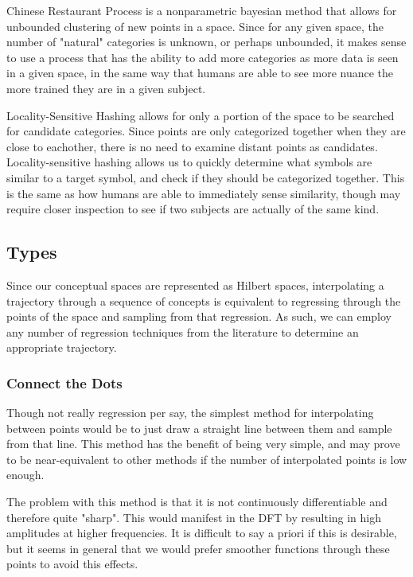 
Chinese Restaurant Process is a nonparametric bayesian method that allows for unbounded clustering of new points in a space. Since for any given space, the number of "natural" categories is unknown, or perhaps unbounded, it makes sense to use a process that has the ability to add more categories as more data is seen in a given space, in the same way that humans are able to see more nuance the more trained they are in a given subject.

Locality-Sensitive Hashing allows for only a portion of the space to be searched for candidate categories.  Since points are only categorized together when they are close to eachother, there is no need to examine distant points as candidates.  Locality-sensitive hashing allows us to quickly determine what symbols are similar to a target symbol, and check if they should be categorized together.  This is the same as how humans are able to immediately sense similarity, though may require closer inspection to see if two subjects are actually of the same kind.


\subsection{Types}
Since our conceptual spaces are represented as Hilbert spaces, interpolating a trajectory through a sequence of concepts is equivalent to regressing through the points of the space and sampling from that regression.  As such, we can employ any number of regression techniques from the literature to determine an appropriate trajectory.

\subsubsection{Connect the Dots}
Though not really regression per say, the simplest method for interpolating between points would be to just draw a straight line between them and sample from that line.  This method has the benefit of being very simple, and may prove to be near-equivalent to other methods if the number of interpolated points is low enough.

The problem with this method is that it is not continuously differentiable and therefore quite "sharp".  This would manifest in the DFT by resulting in high amplitudes at higher frequencies.  It is difficult to say a priori if this is desirable, but it seems in general that we would prefer smoother functions through these points to avoid this effects.

